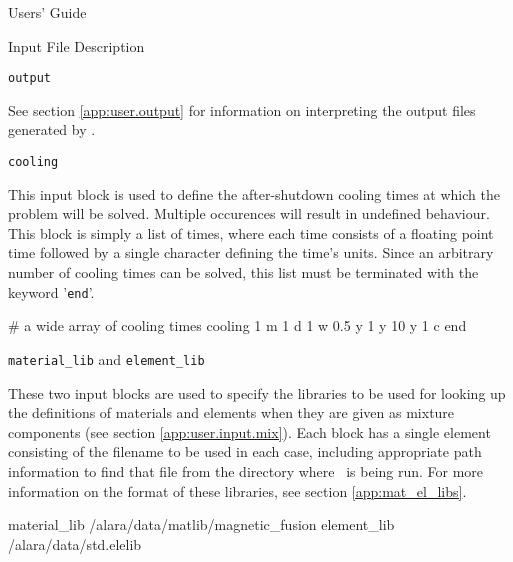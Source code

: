 \begin{chapter}{Users' Guide\label{app:user.guide}}
\begin{section}{Input File Description\label{app:user.input}}
\begin{subsection}{\texttt{output}\label{app:user.input.output}}
      
      See section \ref{app:user.output} for information on
      interpreting the output files generated by \ALARA.
    \end{subsection}

    \begin{subsection}{\texttt{cooling}\label{app:user.input.cool}}
      
      This input block is used to define the after-shutdown cooling
      times at which the problem will be solved.  Multiple occurences
      will result in undefined behaviour.  This block is simply a list
      of times, where each time consists of a floating point time
      followed by a single character defining the time's units.  Since
      an arbitrary number of cooling times can be solved, this list
      must be terminated with the keyword '\texttt{end}'.

      \begin{center}
        \renewcommand{\baselinestretch}{1}\normalsize
        \begin{boxedverbatim}
# a wide array of cooling times
cooling
     1 m
     1 d    
     1 w
   0.5 y
     1 y
    10 y
     1 c
end          
\end{boxedverbatim}
      \end{center}

    \end{subsection}

    \begin{subsection}{\texttt{material\_lib} and \texttt{element\_lib}\label{app:user.input.matlibs}}
      
      These two input blocks are used to specify the libraries to be
      used for looking up the definitions of materials and elements
      when they are given as mixture components (see section
      \ref{app:user.input.mix}).  Each block has a single element
      consisting of the filename to be used in each case, including
      appropriate path information to find that file from the
      directory where \ALARA\ is being run.  For more information on
      the format of these libraries, see section
      \ref{app:mat_el_libs}.

      \begin{center}
        \renewcommand{\baselinestretch}{1}\normalsize
        \begin{boxedverbatim}
material_lib  /alara/data/matlib/magnetic_fusion
element_lib   /alara/data/std.elelib          
\end{boxedverbatim}
      \end{center}
    \end{subsection}


\end{section}
\end{chapter}
